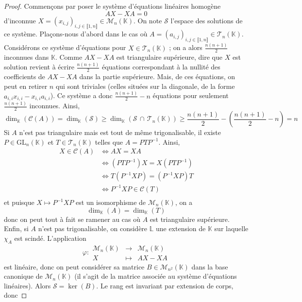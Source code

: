 	\begin{proof}
		Commençons par poser le système d'équations linéaires homogène
		\[ AX - XA = 0 \]
		d'inconnue $X = (x_{i,j})_{i,j \in \llbracket 1, n \rrbracket} \in \mathcal{M}_n(\mathbb{K})$. On note $\mathcal{S}$ l'espace des solutions de ce système.
		\newpar
		Plaçons-nous d'abord dans le cas où $A = (a_{i,j})_{i,j \in \llbracket 1, n \rrbracket} \in \mathcal{T}_n(\mathbb{K})$. Considérons ce système d'équations pour $X \in \mathcal{T}_n(\mathbb{K})$ ; on a alors $\frac{n(n+1)}{2}$ inconnues dans $\mathbb{K}$. Comme $AX-XA$ est triangulaire supérieure, dire que $X$ est solution revient à écrire $\frac{n(n+1)}{2}$ équations correspondant à la nullité des coefficients de $AX - XA$ dans la partie supérieure. Mais, de ces équations, on peut en retirer $n$ qui sont triviales (celles situées sur la diagonale, de la forme $a_{i,i} x_{i,i} - x_{i,i} a_{i,i}$). Ce système a donc $\frac{n(n+1)}{2} - n$ équations pour seulement $\frac{n(n+1)}{2}$ inconnues. Ainsi,
		\[ \dim_{\mathbb{K}}(\mathcal{C}(A)) = \dim_{\mathbb{K}}(\mathcal{S}) \geq \dim_{\mathbb{K}}(\mathcal{S} \, \cap \, \mathcal{T}_n(\mathbb{K})) \geq \frac{n(n+1)}{2} - \left( \frac{n(n+1)}{2} - n \right) = n \]
		Si $A$ n'est pas triangulaire mais est tout de même trigonalisable, il existe $P \in \mathrm{GL}_n(\mathbb{K})$ et $T \in \mathcal{T}_n(\mathbb{K})$ telles que $A = PTP^{-1}$. Ainsi,
		\begin{align*}
			X \in \mathcal{C}(A) &\iff AX = XA \\
			&\iff (PTP^{-1}) X = X (PTP^{-1}) \\
			&\iff T (P^{-1}XP) = (P^{-1}XP) T \\
			&\iff P^{-1}XP \in \mathcal{C}(T) \\
		\end{align*}
		et puisque $X \mapsto P^{-1}XP$ est un isomorphisme de $\mathcal{M}_n(\mathbb{K})$, on a
		\[ \dim_{\mathbb{K}}(A) = \dim_{\mathbb{K}}(T) \]
		donc on peut tout à fait se ramener au cas où $A$ est triangulaire supérieure.
		\newpar
		Enfin, si $A$ n'est pas trigonalisable, on considère $\mathbb{L}$ une extension de $\mathbb{K}$ sur laquelle $\chi_A$ est scindé. L'application
		\[ \varphi :
		\begin{array}{ccc}
			\mathcal{M}_n(\mathbb{K}) &\rightarrow& \mathcal{M}_n(\mathbb{K}) \\
			X &\mapsto& AX-XA
		\end{array}
		\]
		est linéaire, donc on peut considérer sa matrice $B \in \mathcal{M}_{n^2}(\mathbb{K})$ dans la base canonique de $\mathcal{M}_n(\mathbb{K})$ (il s'agit de la matrice associée au système d'équations linéaires). Alors $\mathcal{S} = \ker(B)$. Le rang est invariant par extension de corps, donc

\end{proof}
